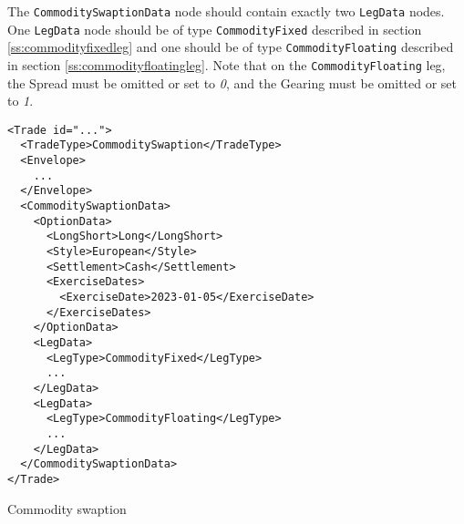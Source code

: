 The \lstinline!CommoditySwaptionData! node should contain exactly two \lstinline!LegData! nodes. One \lstinline!LegData! node should be of type \lstinline!CommodityFixed! described in section \ref{ss:commodityfixedleg} and one should be of type \lstinline!CommodityFloating! described in section \ref{ss:commodityfloatingleg}. Note that on the \lstinline!CommodityFloating! leg, the Spread must be omitted or set to \emph{0}, and the Gearing must be omitted or set to \emph{1}.

\begin{listing}[h!]
\begin{verbatim}
<Trade id="...">
  <TradeType>CommoditySwaption</TradeType>
  <Envelope>
    ...
  </Envelope>
  <CommoditySwaptionData>
    <OptionData>
      <LongShort>Long</LongShort>
      <Style>European</Style>
      <Settlement>Cash</Settlement>
      <ExerciseDates>
        <ExerciseDate>2023-01-05</ExerciseDate>
      </ExerciseDates>
    </OptionData>
    <LegData>
      <LegType>CommodityFixed</LegType>
      ...
    </LegData>
    <LegData>
      <LegType>CommodityFloating</LegType>
      ...
    </LegData>
  </CommoditySwaptionData>
</Trade>
\end{verbatim}
\caption{Commodity swaption}
\label{lst:commodity_swaption}
\end{listing}
